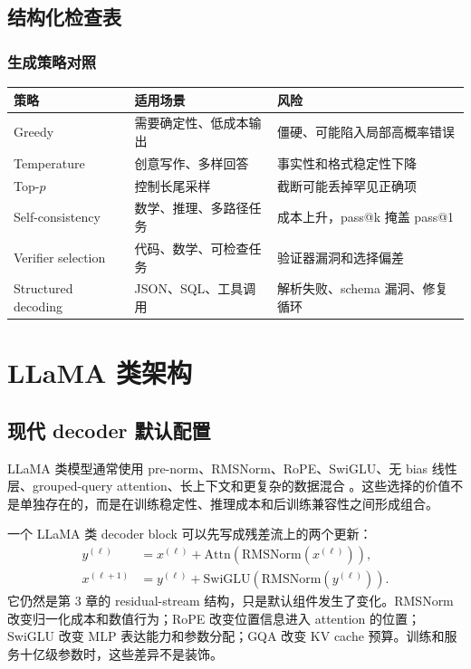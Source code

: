 \documentclass[UTF8,zihao=-4,openany]{ctexbook}
\begin{document}
\section{结构化检查表}
\subsection{生成策略对照}
\begin{center}
\begin{tabular}{p{}p{}p{}}
\toprule
策略 & 适用场景 & 风险 \\
\midrule
Greedy & 需要确定性、低成本输出 & 僵硬、可能陷入局部高概率错误 \\
Temperature & 创意写作、多样回答 & 事实性和格式稳定性下降 \\
Top-$p$ & 控制长尾采样 & 截断可能丢掉罕见正确项 \\
Self-consistency & 数学、推理、多路径任务 & 成本上升，pass@k 掩盖 pass@1 \\
Verifier selection & 代码、数学、可检查任务 & 验证器漏洞和选择偏差 \\
Structured decoding & JSON、SQL、工具调用 & 解析失败、schema 漏洞、修复循环 \\
\bottomrule
\end{tabular}
\end{center}

\chapter{LLaMA 类架构}
\section{现代 decoder 默认配置}
LLaMA 类模型通常使用 pre-norm、RMSNorm、RoPE、SwiGLU、无 bias 线性层、grouped-query attention、长上下文和更复杂的数据混合 \cite{touvron2023llama,touvron2023llama2,dubey2024llama3}。这些选择的价值不是单独存在的，而是在训练稳定性、推理成本和后训练兼容性之间形成组合。

一个 LLaMA 类 decoder block 可以先写成残差流上的两个更新：
\begin{align}
  y^{(\ell)}
    &= x^{(\ell)} +
       \mathrm{Attn}(\mathrm{RMSNorm}(x^{(\ell)})),\\
  x^{(\ell+1)}
    &= y^{(\ell)} +
       \mathrm{SwiGLU}(\mathrm{RMSNorm}(y^{(\ell)})).
\end{align}
它仍然是第 3 章的 residual-stream 结构，只是默认组件发生了变化。RMSNorm 改变归一化成本和数值行为；RoPE 改变位置信息进入 attention 的位置；SwiGLU 改变 MLP 表达能力和参数分配；GQA 改变 KV cache 预算。训练和服务十亿级参数时，这些差异不是装饰。
\end{document}
